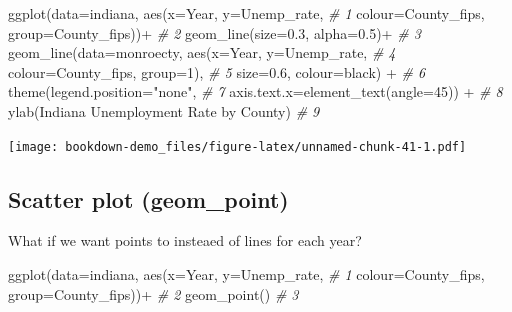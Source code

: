 \documentclass[
]{book}
\newenvironment{Shaded}{\begin{snugshade}}{\end{snugshade}}
\newcommand{\AttributeTok}[1]{\textcolor[rgb]{0.77,0.63,0.00}{#1}}
\newcommand{\CommentTok}[1]{\textcolor[rgb]{0.56,0.35,0.01}{\textit{#1}}}
\newcommand{\DecValTok}[1]{\textcolor[rgb]{0.00,0.00,0.81}{#1}}
\newcommand{\FloatTok}[1]{\textcolor[rgb]{0.00,0.00,0.81}{#1}}
\newcommand{\FunctionTok}[1]{\textcolor[rgb]{0.00,0.00,0.00}{#1}}
\newcommand{\NormalTok}[1]{#1}
\newcommand{\SpecialCharTok}[1]{\textcolor[rgb]{0.00,0.00,0.00}{#1}}
\newcommand{\StringTok}[1]{\textcolor[rgb]{0.31,0.60,0.02}{#1}}
\begin{document}
\begin{Shaded}
\begin{Highlighting}[]
\FunctionTok{ggplot}\NormalTok{(}\AttributeTok{data=}\NormalTok{indiana, }\FunctionTok{aes}\NormalTok{(}\AttributeTok{x=}\NormalTok{Year, }\AttributeTok{y=}\NormalTok{Unemp\_rate,          }\CommentTok{\# 1}
    \AttributeTok{colour=}\NormalTok{County\_fips, }\AttributeTok{group=}\NormalTok{County\_fips))}\SpecialCharTok{+}            \CommentTok{\# 2}
  \FunctionTok{geom\_line}\NormalTok{(}\AttributeTok{size=}\FloatTok{0.3}\NormalTok{, }\AttributeTok{alpha=}\FloatTok{0.5}\NormalTok{)}\SpecialCharTok{+}                       \CommentTok{\# 3}
  \FunctionTok{geom\_line}\NormalTok{(}\AttributeTok{data=}\NormalTok{monroecty, }\FunctionTok{aes}\NormalTok{(}\AttributeTok{x=}\NormalTok{Year, }\AttributeTok{y=}\NormalTok{Unemp\_rate,   }\CommentTok{\# 4}
    \AttributeTok{colour=}\NormalTok{County\_fips, }\AttributeTok{group=}\DecValTok{1}\NormalTok{),                       }\CommentTok{\# 5}
    \AttributeTok{size=}\FloatTok{0.6}\NormalTok{, }\AttributeTok{colour=}\StringTok{\textquotesingle{}black\textquotesingle{}}\NormalTok{) }\SpecialCharTok{+}                         \CommentTok{\# 6}
  \FunctionTok{theme}\NormalTok{(}\AttributeTok{legend.position=}\StringTok{"none"}\NormalTok{,                         }\CommentTok{\# 7}
    \AttributeTok{axis.text.x=}\FunctionTok{element\_text}\NormalTok{(}\AttributeTok{angle=}\DecValTok{45}\NormalTok{)) }\SpecialCharTok{+}               \CommentTok{\# 8}
  \FunctionTok{ylab}\NormalTok{(}\StringTok{\textquotesingle{}Indiana Unemployment Rate by County\textquotesingle{}}\NormalTok{)           }\CommentTok{\# 9}
\end{Highlighting}
\end{Shaded}

\texttt{[image: bookdown-demo\_files/figure-latex/unnamed-chunk-41-1.pdf]}

\hypertarget{scatter-plot-geom_point}{%
\subsection{Scatter plot (geom\_point)}\label{scatter-plot-geom_point}}

What if we want points to insteaed of lines for each year?

\begin{Shaded}
\begin{Highlighting}[]
\FunctionTok{ggplot}\NormalTok{(}\AttributeTok{data=}\NormalTok{indiana, }\FunctionTok{aes}\NormalTok{(}\AttributeTok{x=}\NormalTok{Year, }\AttributeTok{y=}\NormalTok{Unemp\_rate,   }\CommentTok{\# 1}
  \AttributeTok{colour=}\NormalTok{County\_fips, }\AttributeTok{group=}\NormalTok{County\_fips))}\SpecialCharTok{+}       \CommentTok{\# 2}
  \FunctionTok{geom\_point}\NormalTok{()                                   }\CommentTok{\# 3}
\end{Highlighting}
\end{Shaded}
\end{document}
